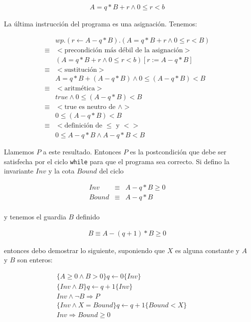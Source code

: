 \documentclass{article}
\begin{document}
\begin{align*}
 A = q*B + r \wedge 0 \leq r < b
\end{align*}

La última instrucción del programa es una asignación. Tenemos:

\begin{align*}
 & wp.(r \leftarrow A-q*B).(A=q*B+r \wedge 0 \leq r < B) \\
 \equiv & <\text{precondición más débil de la asignación}> \\
 & (A=q*B+r \wedge 0 \leq r < b)[r := A-q*B] \\
 \equiv & <\text{sustitución}> \\
 & A=q*B+(A-q*B) \wedge 0 \leq (A-q*B) < B \\
 \equiv & <\text{aritmética}> \\
 & true \wedge 0 \leq (A-q*B) < B \\
 \equiv & <\text{true es neutro de } \wedge> \\
 & 0 \leq (A-q*B) < B \\
 \equiv & <\text{definición de } \leq \text{ y } <> \\
 & 0 \leq A-q*B \wedge A-q*B < B
\end{align*}

Llamemos $P$ a este resultado. Entonces $P$ es la postcondición que debe ser
satisfecha por el ciclo \texttt{while} para
que el programa sea correcto. Si defino la invariante $Inv$ y la cota $Bound$
del ciclo

\begin{eqnarray*}
 Inv & \equiv & A - q*B \geq 0 \\
 Bound & \equiv & A-q*B \\
\end{eqnarray*}

y tenemos el guardia $B$ definido

\begin{align*}
 B \equiv A-(q+1)*B \geq 0
\end{align*}

entonces debo demostrar lo siguiente, suponiendo que $X$ es alguna constante y
$A$ y $B$ son enteros:

\begin{eqnarray}
 \label{divmod:init} \text{\{} A \geq 0 \wedge B > 0 \text{\}} q \leftarrow 0 \text{\{}Inv\text{\}} & & \\
 \label{divmod:inv} \text{\{} Inv \wedge B \text{\}} q \leftarrow q + 1 \text{\{}Inv\text{\}} & & \\
 \label{divmod:final} Inv \wedge \neg B \Rightarrow P & & \\
 \label{divmod:bounddecr} \text{\{} Inv \wedge X = Bound \text{\}} q \leftarrow q + 1 \text{\{} Bound < X \text{\}} & & \\
 \label{divmod:boundnn} Inv \Rightarrow Bound \geq 0 & & 
\end{eqnarray}
\end{document}
